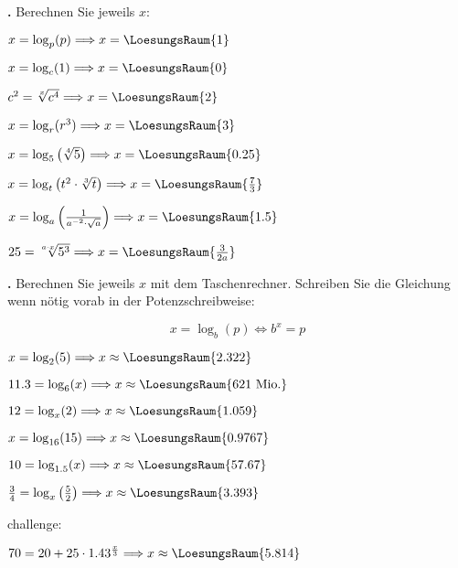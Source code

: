 \TNTeop{}

\newpage

\textbf{\bbwAufgabenNummer{}.}
Berechnen Sie jeweils $x$:

\begin{bbwAufgabenBlock}
\item $x=\log_p(p) \Longrightarrow x =    \LoesungsRaum{1}$
\item $x=\log_c(1) \Longrightarrow x =    \LoesungsRaum{0}$
\item $c^2= \sqrt[x]{c^4} \Longrightarrow x =    \LoesungsRaum{2}$

\item $x=\log_r(r^3) \Longrightarrow x =    \LoesungsRaum{3}$
\item $x=\log_5\left(\sqrt[4]{5}\right) \Longrightarrow x =    \LoesungsRaum{0.25}$
\item $x=\log_t\left(t^2\cdot{}\sqrt[3]{t}\right) \Longrightarrow x =    \LoesungsRaum{\frac73}$
\noTRAINER{\newpage}
\item $x=\log_a\left( \frac1{a^{-2}\cdot{} \sqrt{a}} \right) \Longrightarrow x =    \LoesungsRaum{1.5}$
\item $25=\sqrt[a\cdot{}x]{5^3}  \Longrightarrow x =    \LoesungsRaum{\frac3{2a}}$

\end{bbwAufgabenBlock}


\newpage

\textbf{\bbwAufgabenNummer{}.}
Berechnen Sie jeweils $x$ mit dem Taschenrechner. Schreiben Sie die
Gleichung wenn nötig vorab in der Potenzschreibweise:

$$x=\log_b(p) \Longleftrightarrow b^x=p$$

\begin{bbwAufgabenBlock}
\item $x=\log_2(5) \Longrightarrow x \approx    \LoesungsRaum{2.322}$
\item $11.3 = \log_6(x) \Longrightarrow x \approx    \LoesungsRaum{621 \text{ Mio.}}$
\item $12 = \log_x(2) \Longrightarrow x \approx    \LoesungsRaum{1.059}$
\item $x = \log_{16}(15)  \Longrightarrow x \approx    \LoesungsRaum{0.9767}$
\item $10 = \log_{1.5}(x)  \Longrightarrow x \approx    \LoesungsRaum{57.67}$
\item $\frac34 = \log_{x}\left(\frac52\right)  \Longrightarrow x \approx    \LoesungsRaum{3.393}$\\

\noTRAINER{\newpage}

challenge:

\item $70=20 + 25 \cdot{} 1.43^{\frac{x}3}  \Longrightarrow x \approx    \LoesungsRaum{5.814}$

\end{bbwAufgabenBlock}

